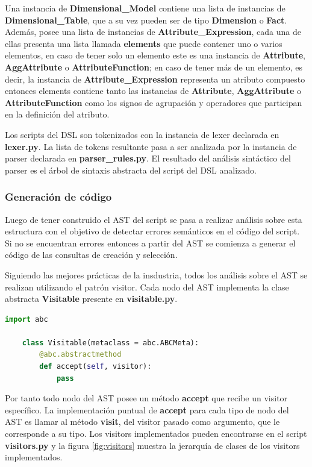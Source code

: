 Una instancia de \textbf{Dimensional\_Model} contiene una lista de instancias de \textbf{Dimensional\_Table}, que a su vez pueden ser de tipo 
\textbf{Dimension} o \textbf{Fact}. Adem\'as, posee una lista de instancias de \textbf{Attribute\_Expression}, cada 
una de ellas presenta 
una lista llamada \textbf{elements} que puede contener uno o varios elementos, en caso de tener solo un elemento 
este es una instancia de \textbf{Attribute}, \textbf{AggAttribute} o \textbf{AttributeFunction}; en caso de tener 
m\'as de un elemento, es decir, la instancia de \textbf{Attribute\_Expression} representa un atributo compuesto entonces 
elements contiene tanto las instancias de \textbf{Attribute}, \textbf{AggAttribute} o \textbf{AttributeFunction} como 
los signos de agrupaci\'on y operadores que participan en la definición del atributo.

Los scripts del DSL son tokenizados con la instancia de lexer declarada en \textbf{lexer.py}. La lista de tokens 
resultante pasa a ser analizada por la instancia de parser declarada en \textbf{parser\_rules.py}. El resultado 
del an\'alisis sint\'actico del parser es el \'arbol de sintaxis abstracta del script del DSL analizado.


\subsubsection{Generaci\'on de c\'odigo}

Luego de tener construido el AST del script se pasa a realizar an\'alisis sobre esta estructura con 
el objetivo de detectar errores sem\'anticos en el c\'odigo del script. Si no se encuentran errores 
entonces a partir del AST se comienza a generar el c\'odigo de las consultas de creaci\'on y selecci\'on.

Siguiendo las mejores pr\'acticas de la insdustria, todos los an\'alisis sobre el AST se realizan 
utilizando el patr\'on visitor\cite{buttner2004digging}. Cada nodo del AST implementa la clase abstracta 
\textbf{Visitable} presente en \textbf{visitable.py}. 

\begin{lstlisting}[label={code:visitable}, caption={Clase abstracta Visitable}, language={python}]
    import abc

    class Visitable(metaclass = abc.ABCMeta):
        @abc.abstractmethod
        def accept(self, visitor):
            pass
\end{lstlisting}

Por tanto todo nodo del AST posee un m\'etodo \textbf{accept} que recibe un visitor espec\'ifico. La implementaci\'on 
puntual de \textbf{accept} para cada tipo de nodo del AST es llamar al m\'etodo \textbf{visit}, del visitor pasado como argumento, 
que le corresponde a su tipo. Los visitors implementados pueden encontrarse en el script \textbf{visitors.py} y la 
figura \ref{fig:visitors} muestra la jerarqu\'ia de clases de los visitors implementados.

